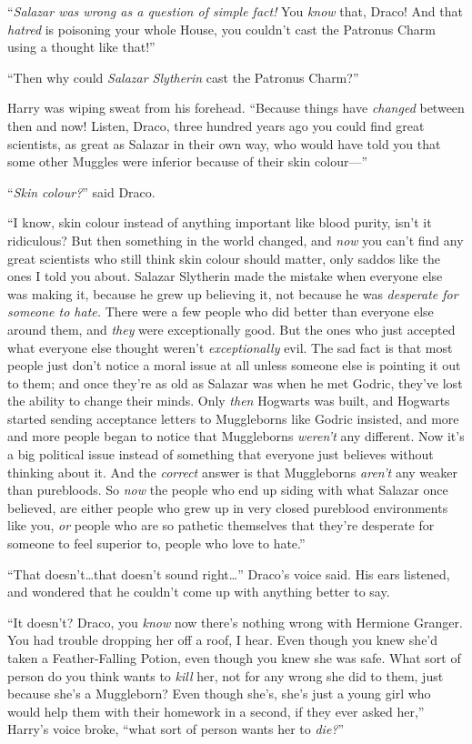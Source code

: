 “\emph{Salazar was wrong as a question of simple fact!} You \emph{know} that, Draco! And that \emph{hatred} is poisoning your whole House, you couldn’t cast the Patronus Charm using a thought like that!”

“Then why could \emph{Salazar Slytherin} cast the Patronus Charm?”

Harry was wiping sweat from his forehead. “Because things have \emph{changed} between then and now! Listen, Draco, three hundred years ago you could find great scientists, as great as Salazar in their own way, who would have told you that some other Muggles were inferior because of their skin colour—”

“\emph{Skin colour?}” said Draco.

“I know, skin colour instead of anything important like blood purity, isn’t it ridiculous? But then something in the world changed, and \emph{now} you can’t find any great scientists who still think skin colour should matter, only saddos like the ones I told you about. Salazar Slytherin made the mistake when everyone else was making it, because he grew up believing it, not because he was \emph{desperate for someone to hate.} There were a few people who did better than everyone else around them, and \emph{they} were exceptionally good. But the ones who just accepted what everyone else thought weren’t \emph{exceptionally} evil. The sad fact is that most people just don’t notice a moral issue at all unless someone else is pointing it out to them; and once they’re as old as Salazar was when he met Godric, they’ve lost the ability to change their minds. Only \emph{then} Hogwarts was built, and Hogwarts started sending acceptance letters to Muggleborns like Godric insisted, and more and more people began to notice that Muggleborns \emph{weren’t} any different. Now it’s a big political issue instead of something that everyone just believes without thinking about it. And the \emph{correct} answer is that Muggleborns \emph{aren’t} any weaker than purebloods. So \emph{now} the people who end up siding with what Salazar once believed, are either people who grew up in very closed pureblood environments like you, \emph{or} people who are so pathetic themselves that they’re desperate for someone to feel superior to, people who love to hate.”

“That doesn’t…that doesn’t sound right…” Draco’s voice said. His ears listened, and wondered that he couldn’t come up with anything better to say.

“It doesn’t? Draco, you \emph{know} now there’s nothing wrong with Hermione Granger. You had trouble dropping her off a roof, I hear. Even though you knew she’d taken a Feather-Falling Potion, even though you knew she was safe. What sort of person do you think wants to \emph{kill} her, not for any wrong she did to them, just because she’s a Muggleborn? Even though she’s, she’s just a young girl who would help them with their homework in a second, if they ever asked her,” Harry’s voice broke, “what sort of person wants her to \emph{die?}”

